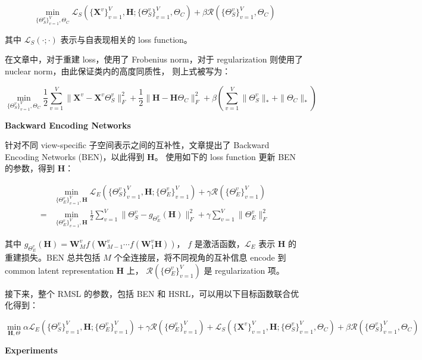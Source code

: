 \documentclass[UTF8]{ctexart}
\begin{document}
$$
\min_{\{\Theta_S^v\}_{v=1}^V, \Theta_C} \mathcal{L}_S(\{\mathbf{X}^v\}_{v=1}^V, \mathbf{H};\{\Theta_S^v\}_{v=1}^V, \Theta_C) + \beta \mathcal{R}(\{\Theta_S^v\}_{v=1}^V, \Theta_C)
$$

其中 $\mathcal{L}_S(\cdot;\cdot)$ 表示与自表现相关的 loss function。

在文章中，对于重建 loss，使用了 Frobenius norm，对于 regularization 则使用了 nuclear norm，由此保证类内的高度同质性，
则上式被写为：

$$
\min_{\{\Theta_S^v\}_{v=1}^V, \Theta_C} \frac{1}{2}\sum_{v=1}^V\|\mathbf{X}^v-\mathbf{X}^v\Theta_S^v\|_F^2 + \frac{1}{2}\|\mathbf{H}-\mathbf{H}\Theta_C\|_F^2 + \beta(\sum_{v=1}^V\|\Theta_S^v\|_* + \|\Theta_C\|_*)
$$

\textbf{Backward Encoding Networks}

针对不同 view-specific 子空间表示之间的互补性，文章提出了 Backward Encoding Networks (BEN)，以此得到 $\mathbf{H}$。
使用如下的 loss function 更新 BEN 的参数，得到 $\mathbf{H}$：

\begin{align*}
    &\min_{\{\Theta_E^v\}_{v=1}^V, \mathbf{H}} \mathcal{L}_E(\{\Theta_S^v\}_{v=1}^V, \mathbf{H}; \{\Theta_E^v\}_{v=1}^V) + \gamma\mathcal{R}(\{\Theta_E^v\}_{v=1}^V)\\
    =&\min_{\{\Theta_E^v\}_{v=1}^V, \mathbf{H}} \frac{1}{2}\sum_{v=1}^V\|\Theta_S^v-g_{\Theta_E^v}(\mathbf{H})\|_F^2 + \gamma\sum_{v=1}^V\|\Theta_E^v\|_F^2
\end{align*}

其中 $g_{\Theta_E^v}(\mathbf{H}) = \mathbf{W}_M^v f(\mathbf{W}_{M-1}^v \cdots f(\mathbf{W}_1^v \mathbf{H}))$，
$f$ 是激活函数，$\mathcal{L}_E$ 表示 $\mathbf{H}$ 的重建损失。BEN 总共包括 $M$ 个全连接层，将不同视角的互补信息 encode 到 common latent representation $\mathbf{H}$ 上，
$\mathcal{R}(\{\Theta_E^v\}_{v=1}^V)$ 是 regularization 项。

接下来，整个 RMSL 的参数，包括 BEN 和 HSRL，可以用以下目标函数联合优化得到：

$$
\min_{\mathbf{H},\Theta} \alpha \mathcal{L}_E(\{\Theta_S^v\}_{v=1}^V, \mathbf{H}; \{\Theta_E^v\}_{v=1}^V) + \gamma\mathcal{R}(\{\Theta_E^v\}_{v=1}^V) + \mathcal{L}_S(\{\mathbf{X}^v\}_{v=1}^V, \mathbf{H};\{\Theta_S^v\}_{v=1}^V, \Theta_C) + \beta \mathcal{R}(\{\Theta_S^v\}_{v=1}^V, \Theta_C)
$$

\textbf{Experiments}
\end{document}
